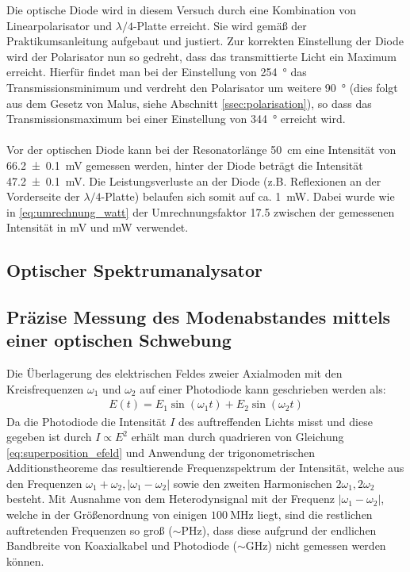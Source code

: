 \documentclass[11pt, a4paper]{article}
\numberwithin{equation}{section}
\begin{document}
Die optische Diode wird in diesem Versuch durch eine Kombination von Linearpolarisator und $\lambda/4$-Platte erreicht.
Sie wird gemäß der Praktikumsanleitung aufgebaut und justiert.
Zur korrekten Einstellung der Diode wird der Polarisator nun so gedreht, dass das transmittierte Licht ein Maximum erreicht.
Hierfür findet man bei der Einstellung von \SI{254}{\degree} das Transmissionsminimum und verdreht den Polarisator um weitere \SI{90}{\degree} (dies folgt aus dem Gesetz von Malus, siehe Abschnitt \ref{ssec:polarisation}), so dass das Transmissionsmaximum bei einer Einstellung von \SI{344}{\degree} erreicht wird.\\
\\
Vor der optischen Diode kann bei der Resonatorlänge \SI{50}{\centi\metre} eine Intensität von \SI{66.2+-0.1}{\milli\volt} gemessen werden, hinter der Diode beträgt die Intensität \SI{47.2+-0.1}{\milli\volt}.
Die Leistungsverluste an der Diode (z.B. Reflexionen an der Vorderseite der $\lambda/4$-Platte) belaufen sich somit auf ca. \SI{1}{\milli\watt}.
Dabei wurde wie in \eqref{eq:umrechnung_watt} der Umrechnungsfaktor \num{17.5} zwischen der gemessenen Intensität in \si{\milli\volt} und \si{\milli\watt} verwendet.

\subsection{Optischer Spektrumanalysator}

\subsection{Präzise Messung des Modenabstandes mittels einer optischen Schwebung}
Die Überlagerung des elektrischen Feldes zweier Axialmoden mit den Kreisfrequenzen $\omega_1$ und $\omega_2$ auf einer Photodiode kann geschrieben werden als:
\begin{align}
	E(t) = E_1 \sin(\omega_1 t) + E_2 \sin(\omega_2 t)
	\label{eq:superposition_efeld}
\end{align}
Da die Photodiode die Intensität $I$ des auftreffenden Lichts misst und diese gegeben ist durch $I \propto E^2$ erhält man durch quadrieren von Gleichung \ref{eq:superposition_efeld} und Anwendung der trigonometrischen Additionstheoreme das resultierende Frequenzspektrum der Intensität, welche aus den Frequenzen $\omega_1 + \omega_2, |\omega_1 - \omega_2|$ sowie den zweiten Harmonischen $2\omega_1, 2\omega_2$ besteht.
Mit Ausnahme von dem Heterodynsignal mit der Frequenz $|\omega_1 - \omega_2|$, welche in der Größenordnung von einigen $\SI{100}{\mega\hertz}$ liegt, sind die restlichen auftretenden Frequenzen so groß ($\sim \si{\peta\hertz}$), dass diese aufgrund der endlichen Bandbreite von Koaxialkabel und Photodiode ($\sim \si{\giga\hertz}$) nicht gemessen werden können.
\end{document}
